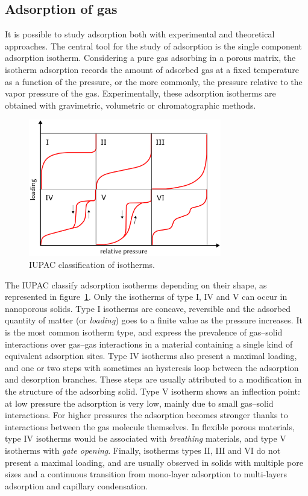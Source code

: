 \documentclass[thesis]{subfiles}
\begin{document}
\subsection{Adsorption of gas}

It is possible to study adsorption both with experimental and theoretical
approaches. The central tool for the study of adsorption is the single component
adsorption isotherm. Considering a pure gas adsorbing in a porous matrix, the
isotherm adsorption records the amount of adsorbed gas at a fixed temperature as
a function of the pressure, or the more commonly, the pressure relative to the
vapor pressure of the gas. Experimentally, these adsorption isotherms are
obtained with gravimetric, volumetric or chromatographic
methods\cite{Ruthven1984, Yang1987}.

\begin{figure}[htb]
    \centering
    \includegraphics[width=0.75\textwidth]{figures/images/iupac-isotherms}
    \caption{IUPAC classification of isotherms.}
    \label{fig:iupac-isotherms}
\end{figure}

The IUPAC classify adsorption isotherms depending on their shape, as represented
in figure~\ref{fig:iupac-isotherms}\cite{Sing1985}. Only the isotherms of type
I, IV and V can occur in nanoporous solids. Type I isotherms are concave,
reversible and the adsorbed quantity of matter (or \emph{loading}) goes to a
finite value as the pressure increases. It is the most common isotherm type, and
express the prevalence of gas--solid interactions over gas--gas interactions in
a material containing a single kind of equivalent adsorption sites. Type IV
isotherms also present a maximal loading, and one or two steps with sometimes an
hysteresis loop between the adsorption and desorption branches. These steps are
usually attributed to a modification in the structure of the adsorbing
solid\cite{Karge1989}. Type V isotherm shows an inflection point: at low pressure
the adsorption is very low, mainly due to small gas--solid interactions. For
higher pressures the adsorption becomes stronger thanks to interactions between
the gas molecule themselves. In flexible porous materials, type IV isotherms
would be associated with \emph{breathing} materials, and type V isotherms with
\emph{gate opening}. Finally, isotherms types II, III and VI do not present a
maximal loading, and are usually observed in solids with multiple pore sizes and
a continuous transition from mono-layer adsorption to multi-layers adsorption and
capillary condensation.
\end{document}
